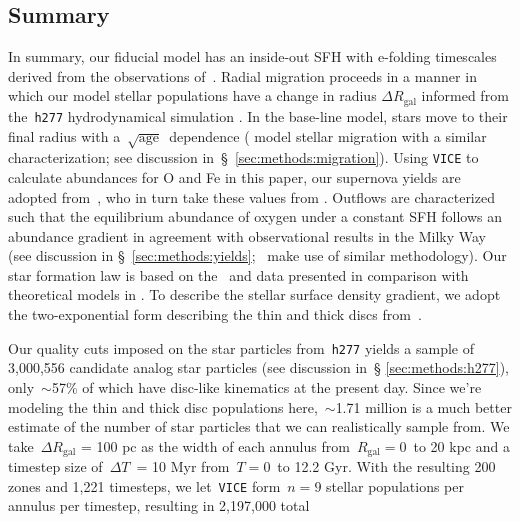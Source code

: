 \documentclass[fleqn, usenatbib]{mnras}
\begin{document}
\subsection{Summary} 
\label{sec:methods:summary} 
In summary, our fiducial model has an inside-out SFH with e-folding timescales 
derived from the observations of~\citet[][see discussion in~\S 
\ref{sec:methods:sfhs}]{Sanchez2020}. Radial migration proceeds in a manner in 
which our model stellar populations have a change in radius 
$\Delta R_\text{gal}$ informed from the~\texttt{h277} hydrodynamical simulation 
\citep[][see discussion in~\S~\ref{sec:methods:h277}]{Christensen2012, 
Zolotov2012, Loebman2012, Loebman2014, Brooks2014}. In the base-line model, 
stars move to their final radius with a~$\sqrt{\text{age}}$~dependence 
(\citealp{Frankel2018, Frankel2020} model stellar migration with a similar 
characterization; see discussion in~\S~\ref{sec:methods:migration}). Using 
\texttt{VICE} to calculate abundances for O and Fe in this paper, our supernova 
yields are adopted from~\citet{Johnson2020}, who in turn take these values from 
\citet{Weinberg2017}. Outflows are characterized such that the equilibrium 
abundance of oxygen under a constant SFH follows an abundance gradient in 
agreement with observational results in the Milky Way (see discussion in 
\S~\ref{sec:methods:yields};~\citet{Nidever2014} make use of similar 
methodology). Our star formation law is based on the~\citet{Bigiel2010} and 
\citet{Leroy2013} data presented in comparison with theoretical models in 
\citet[][see discussion in~\S~\ref{sec:methods:sfe}]{Krumholz2018}. To describe 
the stellar surface density gradient, we adopt the two-exponential form 
describing the thin and thick discs from~\citet[][see discussion in~\S 
\ref{sec:methods:surface_density_gradient}]{Bland-Hawthorn2016}. 
\par 
Our quality cuts imposed on the star particles from~\texttt{h277} yields a 
sample of 3,000,556 candidate analog star particles (see discussion in~\S 
\ref{sec:methods:h277}), only~$\sim$57\% of which have disc-like kinematics 
at the present day. Since we're modeling the thin and thick disc populations 
here,~$\sim$1.71 million is a much better estimate of the number of star 
particles that we can realistically sample from. We take~$\Delta R_\text{gal}$ 
= 100 pc as the width of each annulus from~$R_\text{gal} = 0$~to 20 kpc and a 
timestep size of~$\Delta T$~= 10 Myr from~$T = 0$~to 12.2 Gyr. With the 
resulting 200 zones and 1,221 timesteps, we let~\texttt{VICE} form~$n = 9$ 
stellar populations per annulus per timestep, resulting in 2,197,000 total 
\end{document}

